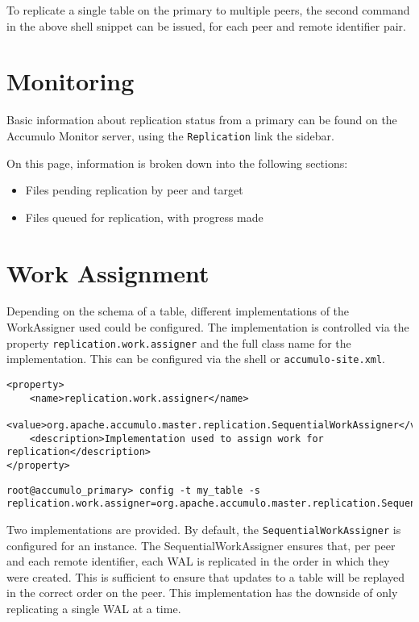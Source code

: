 To replicate a single table on the primary to multiple peers, the second command
in the above shell snippet can be issued, for each peer and remote identifier pair.

\section{Monitoring}

Basic information about replication status from a primary can be found on the Accumulo
Monitor server, using the \texttt{Replication} link the sidebar.

On this page, information is broken down into the following sections:

\begin{itemize}
    \item Files pending replication by peer and target
    \item Files queued for replication, with progress made
\end{itemize}

\section{Work Assignment}

Depending on the schema of a table, different implementations of the WorkAssigner used could
be configured. The implementation is controlled via the property \texttt{replication.work.assigner}
and the full class name for the implementation. This can be configured via the shell or
\texttt{accumulo-site.xml}.

\begingroup\fontsize{8pt}{8pt}\selectfont\begin{verbatim}
<property>
    <name>replication.work.assigner</name>
    <value>org.apache.accumulo.master.replication.SequentialWorkAssigner</value>
    <description>Implementation used to assign work for replication</description>
</property>
\end{verbatim}\endgroup

\begingroup\fontsize{8pt}{8pt}\selectfont\begin{verbatim}
root@accumulo_primary> config -t my_table -s replication.work.assigner=org.apache.accumulo.master.replication.SequentialWorkAssigner
\end{verbatim}\endgroup

Two implementations are provided. By default, the \texttt{SequentialWorkAssigner} is configured for an
instance. The SequentialWorkAssigner ensures that, per peer and each remote identifier, each WAL is
replicated in the order in which they were created. This is sufficient to ensure that updates to a table
will be replayed in the correct order on the peer. This implementation has the downside of only replicating
a single WAL at a time.

